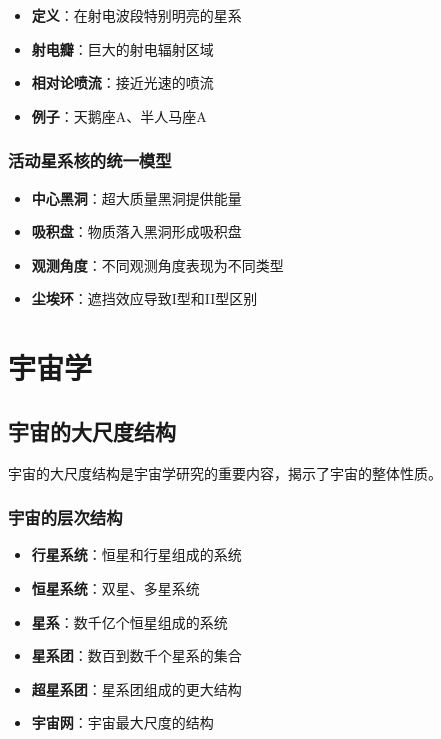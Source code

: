 \documentclass[12pt,UTF8]{ctexbook}
\begin{document}
\begin{itemize}
  \item \textbf{定义}：在射电波段特别明亮的星系
  \item \textbf{射电瓣}：巨大的射电辐射区域
  \item \textbf{相对论喷流}：接近光速的喷流
  \item \textbf{例子}：天鹅座A、半人马座A
\end{itemize}

\subsection{活动星系核的统一模型}

\begin{itemize}
  \item \textbf{中心黑洞}：超大质量黑洞提供能量
  \item \textbf{吸积盘}：物质落入黑洞形成吸积盘
  \item \textbf{观测角度}：不同观测角度表现为不同类型
  \item \textbf{尘埃环}：遮挡效应导致I型和II型区别
\end{itemize}

\chapter{宇宙学}
\section{宇宙的大尺度结构}

宇宙的大尺度结构是宇宙学研究的重要内容，揭示了宇宙的整体性质。

\subsection{宇宙的层次结构}

\begin{itemize}
  \item \textbf{行星系统}：恒星和行星组成的系统
  \item \textbf{恒星系统}：双星、多星系统
  \item \textbf{星系}：数千亿个恒星组成的系统
  \item \textbf{星系团}：数百到数千个星系的集合
  \item \textbf{超星系团}：星系团组成的更大结构
  \item \textbf{宇宙网}：宇宙最大尺度的结构
\end{itemize}
\end{document}
